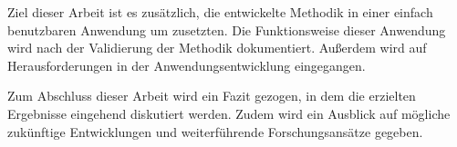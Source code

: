 Ziel dieser Arbeit ist es zusätzlich, die entwickelte Methodik in einer einfach
benutzbaren Anwendung um zusetzten. Die Funktionsweise dieser Anwendung wird 
nach der Validierung der Methodik dokumentiert. Außerdem wird auf Herausforderungen 
in der Anwendungsentwicklung eingegangen.

Zum Abschluss dieser Arbeit wird ein Fazit gezogen, in dem die erzielten 
Ergebnisse eingehend diskutiert werden. Zudem wird ein Ausblick auf 
mögliche zukünftige Entwicklungen und weiterführende Forschungsansätze gegeben.



